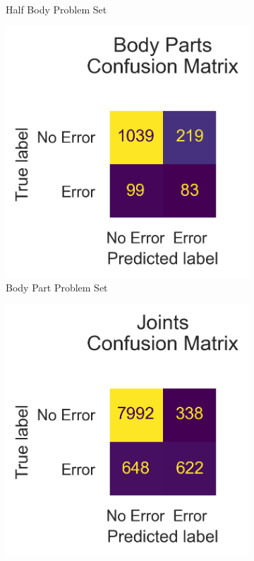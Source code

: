 \begin{figure}[!htbp]
\begin{subfigure}[b]{0.4\linewidth}
      \caption[]{Half Body Problem Set}
      \label{fig:hb_conf_v1}
  \end{subfigure}
  \hfill
  \begin{subfigure}[b]{0.4\linewidth}
      \centering
      \includegraphics[width=\textwidth]{figures/Results/v1/confusion/body_parts_together.png}
      \caption[]{Body Part Problem Set}
      \label{fig:bp_conf_v1}
  \end{subfigure}
  \hfill
  \begin{subfigure}[b]{0.4\linewidth}
      \centering
      \includegraphics[width=\textwidth]{figures/Results/v1/confusion/joints_together.png}

\end{subfigure}
\end{figure}
